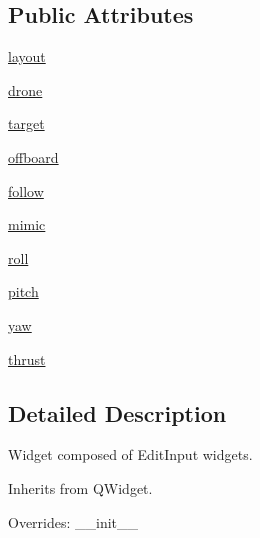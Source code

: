 \subsection*{Public Attributes}
\begin{DoxyCompactItemize}
\item 
\mbox{\hyperlink{classwindshape_1_1gui_1_1widgets_1_1tabs_1_1_settings_widget_1_1_settings_widget_a8b60cf8da275044ee8c65602475ca71e}{layout}}
\item 
\mbox{\hyperlink{classwindshape_1_1gui_1_1widgets_1_1tabs_1_1_settings_widget_1_1_settings_widget_acca46960a019b8c0ddff8b8f884694e0}{drone}}
\item 
\mbox{\hyperlink{classwindshape_1_1gui_1_1widgets_1_1tabs_1_1_settings_widget_1_1_settings_widget_a197f6e0164aea35bc54cece3e11446d9}{target}}
\item 
\mbox{\hyperlink{classwindshape_1_1gui_1_1widgets_1_1tabs_1_1_settings_widget_1_1_settings_widget_a629598843d7ab0157d47036e2a4d9eb2}{offboard}}
\item 
\mbox{\hyperlink{classwindshape_1_1gui_1_1widgets_1_1tabs_1_1_settings_widget_1_1_settings_widget_a6f611c9e38577f97cbc0c18788d57fe2}{follow}}
\item 
\mbox{\hyperlink{classwindshape_1_1gui_1_1widgets_1_1tabs_1_1_settings_widget_1_1_settings_widget_a3e1a5fc56eb46d68c2ce28540394e6a7}{mimic}}
\item 
\mbox{\hyperlink{classwindshape_1_1gui_1_1widgets_1_1tabs_1_1_settings_widget_1_1_settings_widget_a1e1a5d011b65b41689fae589a6291e67}{roll}}
\item 
\mbox{\hyperlink{classwindshape_1_1gui_1_1widgets_1_1tabs_1_1_settings_widget_1_1_settings_widget_ad0fcb5d969b51d751906353d14ac2869}{pitch}}
\item 
\mbox{\hyperlink{classwindshape_1_1gui_1_1widgets_1_1tabs_1_1_settings_widget_1_1_settings_widget_a6d2446ae86ace661f82bda00a93099ef}{yaw}}
\item 
\mbox{\hyperlink{classwindshape_1_1gui_1_1widgets_1_1tabs_1_1_settings_widget_1_1_settings_widget_ae740ec0d8571ac29e1f1bdab525561a3}{thrust}}
\end{DoxyCompactItemize}


\subsection{Detailed Description}
\begin{DoxyVerb}Widget composed of EditInput widgets.

Inherits from QWidget.

Overrides: __init__
\end{DoxyVerb}
 

